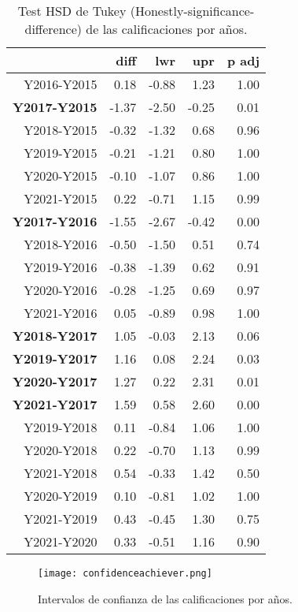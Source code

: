 \begin{table}[H]
\centering
\caption{Test HSD de Tukey (Honestly-significance-difference) de las calificaciones por años.}
\label{tab:Tukeyachiever}
\begin{tabular}{rrrrr}
  \hline
 & diff & lwr & upr & p adj \\ 
  \hline
Y2016-Y2015 & 0.18 & -0.88 & 1.23 & 1.00 \\ 
  \textbf{Y2017-Y2015} & -1.37 & -2.50 & -0.25 & 0.01 \\ 
  Y2018-Y2015 & -0.32 & -1.32 & 0.68 & 0.96 \\ 
  Y2019-Y2015 & -0.21 & -1.21 & 0.80 & 1.00 \\ 
  Y2020-Y2015 & -0.10 & -1.07 & 0.86 & 1.00 \\ 
  Y2021-Y2015 & 0.22 & -0.71 & 1.15 & 0.99 \\ 
  \textbf{Y2017-Y2016} & -1.55 & -2.67 & -0.42 & 0.00 \\ 
  Y2018-Y2016 & -0.50 & -1.50 & 0.51 & 0.74 \\ 
  Y2019-Y2016 & -0.38 & -1.39 & 0.62 & 0.91 \\ 
  Y2020-Y2016 & -0.28 & -1.25 & 0.69 & 0.97 \\ 
  Y2021-Y2016 & 0.05 & -0.89 & 0.98 & 1.00 \\ 
  \textbf{Y2018-Y2017} & 1.05 & -0.03 & 2.13 & 0.06 \\ 
  \textbf{Y2019-Y2017} & 1.16 & 0.08 & 2.24 & 0.03 \\ 
  \textbf{Y2020-Y2017} & 1.27 & 0.22 & 2.31 & 0.01 \\ 
  \textbf{Y2021-Y2017} & 1.59 & 0.58 & 2.60 & 0.00 \\ 
  Y2019-Y2018 & 0.11 & -0.84 & 1.06 & 1.00 \\ 
  Y2020-Y2018 & 0.22 & -0.70 & 1.13 & 0.99 \\ 
  Y2021-Y2018 & 0.54 & -0.33 & 1.42 & 0.50 \\ 
  Y2020-Y2019 & 0.10 & -0.81 & 1.02 & 1.00 \\ 
  Y2021-Y2019 & 0.43 & -0.45 & 1.30 & 0.75 \\ 
  Y2021-Y2020 & 0.33 & -0.51 & 1.16 & 0.90 \\ 
   \hline
\end{tabular}
\end{table}

\begin{figure}[H]
    \centering
    \texttt{[image: confidenceachiever.png]}
    \caption{Intervalos de confianza de las calificaciones por años.}
    \label{fig:confidenceachiever}
\end{figure}

